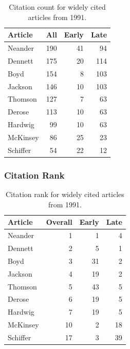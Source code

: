 \documentclass[
  10pt,
  letterpaper,
  DIV=11,
  numbers=noendperiod,
  twoside]{scrartcl}
\begin{document}
\begin{longtable}[]{@{}lrrr@{}}

\caption{\label{tbl-citation-count-1991}Citation count for widely cited
articles from 1991.}

\tabularnewline

\toprule\noalign{}
Article & All & Early & Late \\
\midrule\noalign{}
\endhead
\bottomrule\noalign{}
\endlastfoot
Neander & 190 & 41 & 94 \\
Dennett & 175 & 20 & 114 \\
Boyd & 154 & 8 & 103 \\
Jackson & 146 & 10 & 103 \\
Thomson & 127 & 7 & 63 \\
Derose & 113 & 10 & 63 \\
Hardwig & 99 & 10 & 63 \\
McKinsey & 86 & 25 & 23 \\
Schiffer & 54 & 22 & 12 \\

\end{longtable}

\subsubsection*{Citation Rank}\label{citation-rank-15}

\begin{longtable}[]{@{}lrrr@{}}

\caption{\label{tbl-citation-rank-1991}Citation rank for widely cited
articles from 1991.}

\tabularnewline

\toprule\noalign{}
Article & Overall & Early & Late \\
\midrule\noalign{}
\endhead
\bottomrule\noalign{}
\endlastfoot
Neander & 1 & 1 & 4 \\
Dennett & 2 & 5 & 1 \\
Boyd & 3 & 31 & 2 \\
Jackson & 4 & 19 & 2 \\
Thomson & 5 & 43 & 5 \\
Derose & 6 & 19 & 5 \\
Hardwig & 7 & 19 & 5 \\
McKinsey & 10 & 2 & 18 \\
Schiffer & 17 & 3 & 39 \\

\end{longtable}
\end{document}
